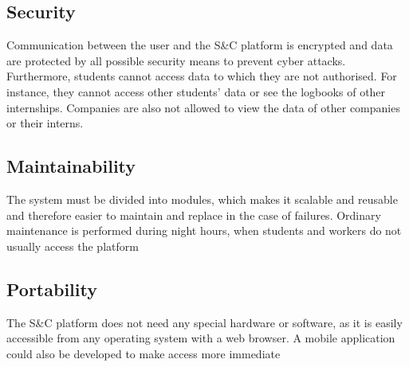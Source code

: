 \subsection{Security}
Communication between the user and the S\&C platform is encrypted and data are protected by all possible security means to prevent cyber attacks. Furthermore, students cannot access data to which they are not authorised. For instance, they cannot access other students' data or see the logbooks of other internships. Companies are also not allowed to view the data of other companies or their interns.
\subsection{Maintainability}
The system must be divided into modules, which makes it scalable and reusable and therefore easier to maintain and replace in the case of failures. Ordinary maintenance is performed during night hours, when students and workers do not usually access the platform
\subsection{Portability}
The S\&C platform does not need any special hardware or software, as it is easily accessible from any operating system with a web browser. A mobile application could also be developed to make access more immediate